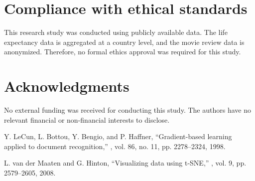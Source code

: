 \documentclass{article}
\begin{document}
\section{Compliance with ethical standards}
\label{sec:ethics}
This research study \cite{LeCun98} was conducted using publicly available data. The life expectancy data is aggregated at a country level, and the movie review data is anonymized. Therefore, no formal ethics approval was required for this study.

\section{Acknowledgments}
\label{sec:acknowledgments}
No external funding was received for conducting this study. The authors have no relevant financial or non-financial interests to disclose.


% 
\begin{thebibliography}{99}

  Y. LeCun, L. Bottou, Y. Bengio, and P. Haffner,
  \newblock ``Gradient-based learning applied to document recognition,''
  , vol. 86, no. 11, pp. 2278--2324, 1998.
  
  L. van der Maaten and G. Hinton,
  \newblock ``Visualizing data using t-SNE,''
  , vol. 9, pp. 2579--2605, 2008.
  
  \end{thebibliography}
\end{document}
